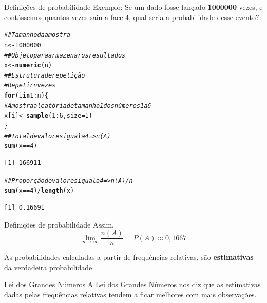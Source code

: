 \documentclass[10pt]{beamer}\usepackage[]{graphicx}\usepackage[]{color}
\makeatletter
\newcommand{\hlnum}[1]{\textcolor[rgb]{0.686,0.059,0.569}{#1}}%
\newcommand{\hlcom}[1]{\textcolor[rgb]{0.678,0.584,0.686}{\textit{#1}}}%
\newcommand{\hlopt}[1]{\textcolor[rgb]{0,0,0}{#1}}%
\newcommand{\hlstd}[1]{\textcolor[rgb]{0.345,0.345,0.345}{#1}}%
\newcommand{\hlkwa}[1]{\textcolor[rgb]{0.161,0.373,0.58}{\textbf{#1}}}%
\newcommand{\hlkwb}[1]{\textcolor[rgb]{0.69,0.353,0.396}{#1}}%
\newcommand{\hlkwc}[1]{\textcolor[rgb]{0.333,0.667,0.333}{#1}}%
\newcommand{\hlkwd}[1]{\textcolor[rgb]{0.737,0.353,0.396}{\textbf{#1}}}%
\newenvironment{kframe}{%
 \def\at@end@of@kframe{}%
 \ifinner\ifhmode%
  \def\at@end@of@kframe{\end{minipage}}%
  \begin{minipage}{\columnwidth}%
 \fi\fi%
 \def\FrameCommand##1{\hskip\@totalleftmargin \hskip-\fboxsep
 \colorbox{shadecolor}{##1}\hskip-\fboxsep
     \hskip-\linewidth \hskip-\@totalleftmargin \hskip\columnwidth}%
 \MakeFramed {\advance\hsize-\width
   \@totalleftmargin\z@ \linewidth\hsize
   \@setminipage}}%
 {\par\unskip\endMakeFramed%
 \at@end@of@kframe}
\newenvironment{knitrout}{}{} %
\theoremstyle{definition}
\makeatother
\begin{document}
\begin{frame}[fragile]{Definições de probabilidade}
  Exemplo: Se um dado fosse lançado \textbf{1000000} vezes, e contássemos
  quantas vezes saiu a face 4, qual seria a probabilidade desse evento?
\begin{knitrout}\footnotesize
{}\color{fgcolor}\begin{kframe}
\begin{alltt}
\hlcom{## Tamanho da amostra}
\hlstd{n} \hlkwb{<-} \hlnum{1000000}
\hlcom{## Objeto para armazenar os resultados}
\hlstd{x} \hlkwb{<-} \hlkwd{numeric}\hlstd{(n)}
\hlcom{## Estrutura de repetição}
\hlcom{# Repetir n vezes}
\hlkwa{for}\hlstd{(i} \hlkwa{in} \hlnum{1}\hlopt{:}\hlstd{n)\{}
    \hlcom{# Amostra aleatória de tamanho 1 dos números 1 a 6}
    \hlstd{x[i]} \hlkwb{<-} \hlkwd{sample}\hlstd{(}\hlnum{1}\hlopt{:}\hlnum{6}\hlstd{,} \hlkwc{size} \hlstd{=} \hlnum{1}\hlstd{)}
\hlstd{\}}
\hlcom{## Total de valores igual a 4 => n(A)}
\hlkwd{sum}\hlstd{(x} \hlopt{==} \hlnum{4}\hlstd{)}
\end{alltt}
\begin{verbatim}
[1] 166911
\end{verbatim}
\begin{alltt}
\hlcom{## Proporção de valores igual a 4 => n(A)/n}
\hlkwd{sum}\hlstd{(x} \hlopt{==} \hlnum{4}\hlstd{)}\hlopt{/}\hlkwd{length}\hlstd{(x)}
\end{alltt}
\begin{verbatim}
[1] 0.16691
\end{verbatim}
\end{kframe}
\end{knitrout}
\end{frame}

\begin{frame}[fragile]{Definições de probabilidade}
  Assim,
  \begin{equation*}
    \lim_{n \rightarrow \infty} \frac{n(A)}{n} = P(A) \approx 0,1667
  \end{equation*}
  \vspace{1em}

  As probabilidades calculadas a partir de frequências relativas, são
  \textbf{estimativas} da verdadeira probabilidade
  \begin{block}{Lei dos Grandes Números}
    A Lei dos Grandes Números nos diz que as estimativas dadas pelas
    frequências relativas tendem a ficar melhores com mais observações.
  \end{block}
\end{frame}
\end{document}
